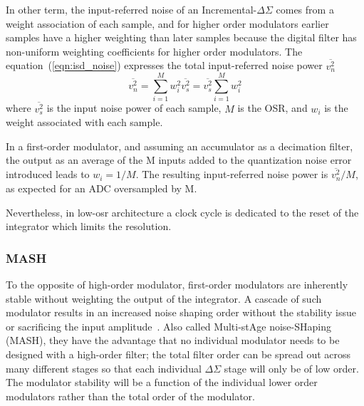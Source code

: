 
In other term, the input-referred noise of an Incremental-\(\Delta\Sigma \) comes from a weight association of each sample, and for higher order modulators earlier samples have a higher weighting than later samples because the digital filter has non-uniform weighting coefficients for higher order modulators. The equation~(\ref{eqn:isd_noise}) expresses the total input-referred noise power \(\overline{v_{n}^{2}}\)
\begin{equation}
	\overline{v_{n}^{2}}=\sum_{i=1}^{M}w_{i}^{2}\overline{v_{s}^{2}}=\overline{v_{s}^{2}}\sum_{i=1}^{M}w_{i}^{2}
\label{eqn:isd_noise}
\end{equation}
where \(\overline{v_{s}^{2}}\) is the input noise power of each sample, \(M\) is the OSR, and \(w_i\) is the weight associated with each sample.

In a first-order modulator, and assuming an accumulator as a decimation filter, the output as an average of the M inputs added to the quantization noise error introduced leads to \(w_i=1/M\). The resulting input-referred noise power is \(\overline{v_{n}^{2}}/M\), as expected for an ADC oversampled by M.

Nevertheless, in low-osr architecture a clock cycle is dedicated to the reset of the integrator which limits the resolution.

\subsubsection{MASH}
To the opposite of high-order modulator, first-order modulators are inherently stable without weighting the output of the integrator. A cascade of such modulator results in an increased noise shaping order without the stability issue or sacrificing the input amplitude~\cite{Brooks1997}. Also called Multi-stAge noise-SHaping (MASH), they have the advantage that no individual modulator needs to be designed with a high-order filter; the total filter order can be spread out across many different stages so that each individual \(\Delta\Sigma \) stage will only be of low order. The modulator stability will be a function of the individual lower order modulators rather than the total order of the modulator.

